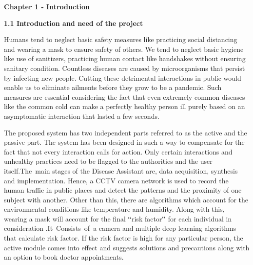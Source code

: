 \documentclass[12pt]{article}
\begin{document}
\begin{Center}
{\fontsize{18pt}{21.6pt}\selectfont \textbf{Chapter 1 - Introduction}}
\end{Center}
\vspace{\baselineskip}
\vspace{\baselineskip}

\begin{justify}
{\fontsize{14pt}{16.8pt}\selectfont \textbf{1.1 Introduction and need of the project}}
\vspace{\baselineskip}

\end{justify}
\setlength{\parskip}{0.0pt}
\begin{justify}
Humans tend to neglect basic safety measures like practicing social distancing and wearing a mask to ensure safety of others. We tend to neglect basic hygiene like use of sanitizers, practicing human contact like handshakes without ensuring sanitary condition. Countless diseases are caused by microorganisms that persist by infecting new people. Cutting these detrimental interactions in public would enable us to eliminate ailments before they grow to be a pandemic. Such measures are essential considering the fact that even extremely common diseases like the common cold can make a perfectly healthy person ill purely based on an asymptomatic interaction that lasted a few seconds.
\end{justify}

\vspace{\baselineskip}
\setlength{\parskip}{9.96pt}
\setlength{\parskip}{0.0pt}
\begin{justify}
The proposed system has two independent parts referred to as the active and the passive part. The system has been designed in such a way to compensate for the fact that not every interaction calls for action. Only certain interactions and unhealthy practices need to be flagged to the authorities and the user itself.The\ main stages of the Disease  Assistant are, data acquisition, synthesis and implementation. Hence, a CCTV camera network is used to record the human traffic in public places and detect the patterns and the proximity of one subject with another. Other than this, there are algorithms which account for the environmental conditions like temperature and humidity. Along with this, wearing a mask will account for the final $``$risk factor$"$  for each individual in consideration .It\ Consists\ of\ a  camera and multiple deep learning algorithms that calculate risk factor. If the risk factor is  high for any particular person, the active module comes into effect and suggests solutions and  precautions along with an option to book doctor appointments.
\end{justify}
\end{document}
